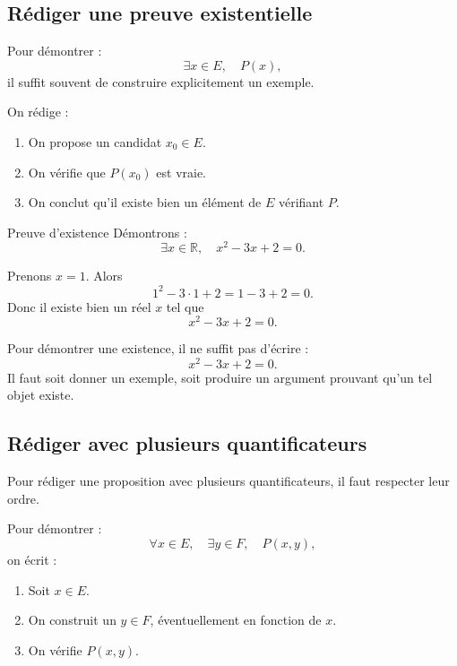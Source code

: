 \documentclass[11pt,a4paper]{article}
\begin{document}
\subsection{Rédiger une preuve existentielle}

\begin{methodebox}
Pour démontrer :
\[
\exists x\in E,\quad P(x),
\]
il suffit souvent de construire explicitement un exemple.

On rédige :
\begin{enumerate}
    \item On propose un candidat $x_0\in E$.
    \item On vérifie que $P(x_0)$ est vraie.
    \item On conclut qu'il existe bien un élément de $E$ vérifiant $P$.
\end{enumerate}
\end{methodebox}

\begin{exemplebox}{Preuve d'existence}{}
Démontrons :
\[
\exists x\in\mathbb{R},\quad x^2-3x+2=0.
\]

Prenons $x=1$. Alors
\[
1^2-3\cdot 1+2=1-3+2=0.
\]
Donc il existe bien un réel $x$ tel que
\[
x^2-3x+2=0.
\]
\end{exemplebox}

\begin{erreurbox}
Pour démontrer une existence, il ne suffit pas d'écrire :
\[
x^2-3x+2=0.
\]
Il faut soit donner un exemple, soit produire un argument prouvant qu'un tel objet existe.
\end{erreurbox}

\subsection{Rédiger avec plusieurs quantificateurs}

\begin{methodebox}
Pour rédiger une proposition avec plusieurs quantificateurs, il faut respecter leur ordre.

Pour démontrer :
\[
\forall x\in E,\quad \exists y\in F,\quad P(x,y),
\]
on écrit :
\begin{enumerate}
    \item Soit $x\in E$.
    \item On construit un $y\in F$, éventuellement en fonction de $x$.
    \item On vérifie $P(x,y)$.
\end{enumerate}
\end{methodebox}
\end{document}
